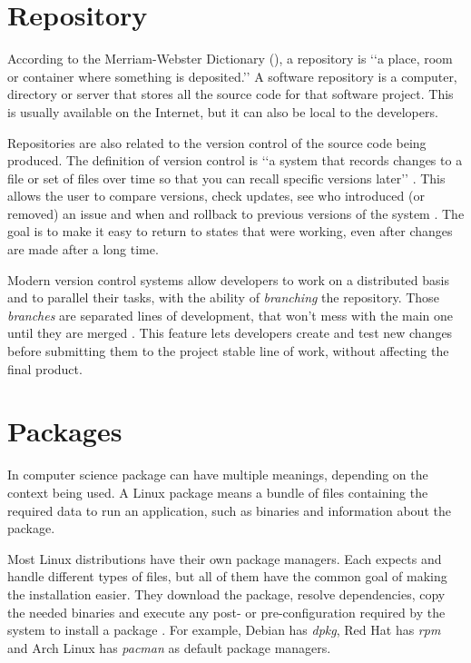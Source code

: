 \section{Repository}
\label {sec:repository}

According to the Merriam-Webster Dictionary (\citeyear{webster2017repository}), a repository is \lq\lq a place, room or container where something is deposited.\rq\rq{} A software repository is a computer, directory or server that stores all the source code for that software project. This is usually available on the Internet, but it can also be local to the developers.

Repositories are also related to the version control of the source code being produced. The definition of version control is \lq\lq a system that records changes to a file or set of files over time so that you can recall specific versions later\rq\rq{} \cite{chacon2014pro}. This allows the user to compare versions, check updates, see who introduced (or removed) an issue and when and rollback to previous versions of the system \cite{chacon2014pro}. The goal is to make it easy to return to states that were working, even after changes are made after a long time.

Modern version control systems allow developers to work on a distributed basis and to parallel their tasks, with the ability of \textit{branching} the repository. Those \textit{branches} are separated lines of development, that won't mess with the main one until they are merged \cite{chacon2014pro}. This feature lets developers create and test new changes before submitting them to the project stable line of work, without affecting the final product.

\section{Packages}
\label {sec:packages}

In computer science package can have multiple meanings, depending on the context being used. A Linux package means a bundle of files containing the required data to run an application, such as binaries and information about the package.

Most Linux distributions have their own package managers. Each expects and handle different types of files, but all of them have the common goal of making the installation easier. They download the package, resolve dependencies, copy the needed binaries and execute any post- or pre-configuration required by the system to install a package \cite{linode2017linux}. For example, Debian has \textit{dpkg}, Red Hat has \textit{rpm} and Arch Linux has \textit{pacman} as default package managers.

